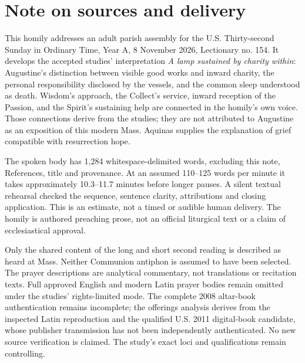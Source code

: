 \section{Note on sources and delivery}
This homily addresses an adult parish assembly for the U.S. Thirty-second Sunday in Ordinary Time, Year A, 8 November 2026, Lectionary no. 154. It develops the accepted studies' interpretation \textit{A lamp sustained by charity within}: Augustine's distinction between visible good works and inward charity, the personal responsibility disclosed by the vessels, and the common sleep understood as death. Wisdom's approach, the Collect's service, inward reception of the Passion, and the Spirit's sustaining help are connected in the homily's own voice. Those connections derive from the studies; they are not attributed to Augustine as an exposition of this modern Mass. Aquinas supplies the explanation of grief compatible with resurrection hope.

The spoken body has 1,284 whitespace-delimited words, excluding this note, References, title and provenance. At an assumed 110--125 words per minute it takes approximately 10.3--11.7 minutes before longer pauses. A silent textual rehearsal checked the sequence, sentence clarity, attributions and closing application. This is an estimate, not a timed or audible human delivery. The homily is authored preaching prose, not an official liturgical text or a claim of ecclesiastical approval.

Only the shared content of the long and short second reading is described as heard at Mass. Neither Communion antiphon is assumed to have been selected. The prayer descriptions are analytical commentary, not translations or recitation texts. Full approved English and modern Latin prayer bodies remain omitted under the studies' rights-limited mode. The complete 2008 altar-book authentication remains incomplete; the offerings analysis derives from the inspected Latin reproduction and the qualified U.S. 2011 digital-book candidate, whose publisher transmission has not been independently authenticated. No new source verification is claimed. The study's exact loci and qualifications remain controlling.

